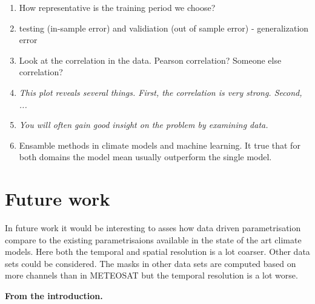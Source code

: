 \begin{enumerate}
    \item How representative is the training period we choose?
    \item testing (in-sample error) and validiation (out of sample error) - generalization error 
    \item Look at the correlation in the data. Pearson correlation? Someone else correlation?
    \item \textit{This plot reveals several things. First, the correlation is very strong. Second, ... }
    \item \textit{You will often gain good insight on the problem by examining data.}
    \item Ensamble methods in climate models and machine learning. It true that for both domains the model mean usually outperform the single model.
\end{enumerate}

\section{Future work}
In future work it would be interesting to asses how data driven parametrisation compare to the existing parametrisaions available in the state of the art climate models. Here both the temporal and spatial resolution is a lot coarser. Other data sets could be considered. The masks in other data sets are computed based on more channels than in METEOSAT but the temporal resolution is a lot worse. 


\textbf{From the introduction.}

